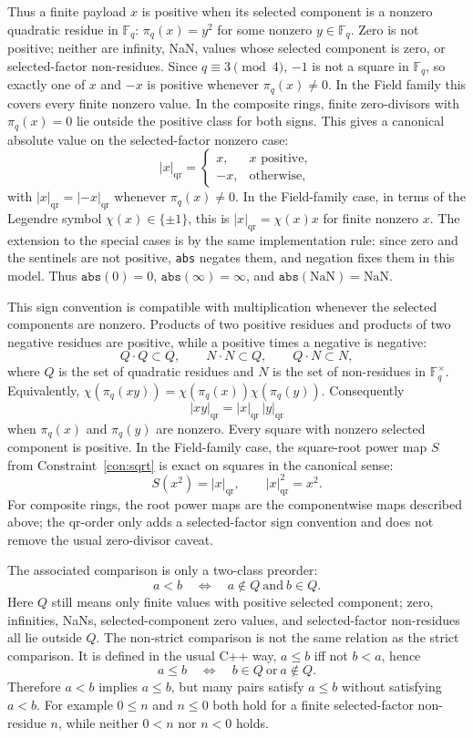\documentclass[11pt]{article}
\newcommand{\F}{\mathbb{F}}
\theoremstyle{plain}
\begin{document}
Thus a finite payload \(x\) is positive when its selected component is a
nonzero quadratic residue in \(\F_q\): \(\pi_q(x)=y^2\) for some nonzero
\(y\in\F_q\).  Zero is not positive; neither are infinity, NaN, values whose
selected component is zero, or selected-factor non-residues.  Since
\(q\equiv3\pmod4\), \(-1\) is not a square in \(\F_q\), so exactly one of
\(x\) and \(-x\) is positive whenever \(\pi_q(x)\ne0\).  In the Field family
this covers every finite nonzero value.  In the composite rings, finite
zero-divisors with \(\pi_q(x)=0\) lie outside the positive class for both signs.
This gives a canonical absolute value on the selected-factor nonzero case:
\[
  |x|_{\mathrm{qr}} =
  \begin{cases}
    x, & x\text{ positive},\\
    -x, & \text{otherwise},
  \end{cases}
\]
with \(|x|_{\mathrm{qr}}=|-x|_{\mathrm{qr}}\) whenever \(\pi_q(x)\ne0\).  In
the Field-family case, in terms of the Legendre symbol
\(\chi(x)\in\{\pm1\}\), this is \(|x|_{\mathrm{qr}}=\chi(x)x\) for finite
nonzero \(x\).  The extension to the special cases is by the same
implementation rule: since zero and the sentinels are not positive,
\texttt{abs} negates them, and negation fixes them in this model.  Thus
\(\texttt{abs}(0)=0\), \(\texttt{abs}(\infty)=\infty\), and
\(\texttt{abs}(\mathrm{NaN})=\mathrm{NaN}\).

This sign convention is compatible with multiplication whenever the selected
components are nonzero.  Products of two positive residues and products of two
negative residues are positive, while a positive times a negative is negative:
\[
  Q\cdot Q\subset Q,\qquad N\cdot N\subset Q,\qquad Q\cdot N\subset N,
\]
where \(Q\) is the set of quadratic residues and \(N\) is the set of
non-residues in \(\F_q^\times\).  Equivalently,
\(\chi(\pi_q(xy))=\chi(\pi_q(x))\chi(\pi_q(y))\).  Consequently
\[
  |xy|_{\mathrm{qr}}=|x|_{\mathrm{qr}}\,|y|_{\mathrm{qr}}
\]
when \(\pi_q(x)\) and \(\pi_q(y)\) are nonzero.  Every square with nonzero
selected component is positive.  In the Field-family case, the square-root
power map \(S\) from Constraint~\ref{con:sqrt} is exact on squares in the
canonical sense:
\[
  S(x^2)=|x|_{\mathrm{qr}},\qquad |x|_{\mathrm{qr}}^2=x^2.
\]
For composite rings, the root power maps are the componentwise maps described
above; the qr-order only adds a selected-factor sign convention and does not
remove the usual zero-divisor caveat.

The associated comparison is only a two-class preorder:
\[
  a < b \quad\Longleftrightarrow\quad a\notin Q\ \text{and}\ b\in Q.
\]
Here \(Q\) still means only finite values with positive selected component;
zero, infinities, NaNs, selected-component zero values, and selected-factor
non-residues all lie outside \(Q\).  The non-strict comparison is not the same
relation as the strict comparison.  It is defined in the usual C++ way,
\(a\le b\) iff not \(b<a\), hence
\[
  a \le b \quad\Longleftrightarrow\quad b\in Q\ \text{or}\ a\notin Q.
\]
Therefore \(a<b\) implies \(a\le b\), but many pairs satisfy \(a\le b\) without
satisfying \(a<b\).  For example \(0\le n\) and \(n\le0\) both hold for a
finite selected-factor non-residue \(n\), while neither \(0<n\) nor \(n<0\)
holds.
\end{document}
